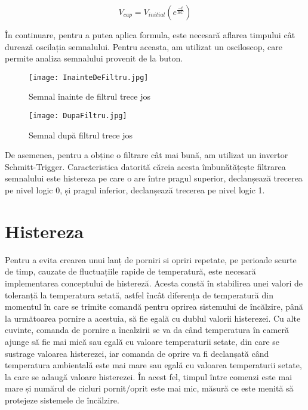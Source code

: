 \begin{equation}
V_{cap} = V_{initial}(e^{\frac{-t}{RC}})                 
\end{equation}

	În continuare, pentru a putea aplica formula, este necesară aflarea timpului cât durează oscilația semnalului. Pentru aceasta, am utilizat un osciloscop, care permite analiza semnalului provenit de la buton.

\begin{figure}[H]
	\centering
    	\texttt{[image: InainteDeFiltru.jpg]}
	\caption{Semnal înainte de filtrul trece jos}
	\label{fig:InainteDeFiltru}
\end{figure}

\begin{figure}[H]
   	\centering
    	\texttt{[image: DupaFiltru.jpg]}
	\caption{Semnal după filtrul trece jos}
	\label{fig:DupaFiltru}
\end{figure}
	
	De asemenea, pentru a obține o filtrare cât mai bună, am utilizat un invertor Schmitt-Trigger. Caracteristica datorită căreia acesta îmbunătățește filtrarea semnalului este histereza pe care o are între pragul superior, declanșează trecerea pe nivel logic 0, și pragul inferior, declanșează trecerea pe nivel logic 1.  
	
\section{Histereza}

	Pentru a evita crearea unui lanț de porniri si opriri repetate, pe perioade scurte de timp, cauzate de fluctuațiile rapide de temperatură, este necesară implementarea conceptului de histereză. Acesta constă în stabilirea unei valori de toleranță la temperatura setată, astfel încât diferența de temperatură din momentul în care se trimite comandă pentru oprirea sistemului de încălzire, până la următoarea pornire a acestuia, să fie egală cu dublul valorii histerezei. Cu alte cuvinte, comanda de pornire a încalzirii se va da când temperatura în cameră ajunge să fie mai mică sau egală cu valoare temperaturii setate, din care se sustrage valoarea histerezei, iar comanda de oprire va fi declanșată când temperatura ambientală este mai mare sau egală cu valoarea temperaturii setate, la care se adaugă valoare histerezei. În acest fel, timpul între comenzi este mai mare și numărul de cicluri pornit/oprit este mai mic, măsură ce este menită să protejeze sistemele de încălzire.


	 
 